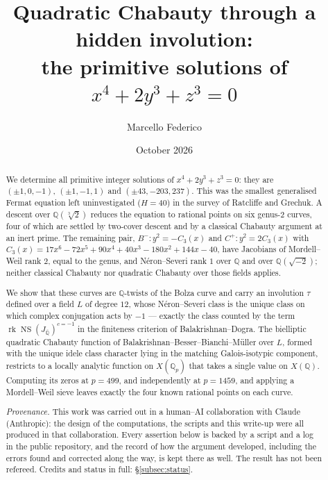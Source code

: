 \documentclass[11pt,reqno]{amsart}
\title[Quadratic Chabauty through a hidden involution]
      {Quadratic Chabauty through a hidden involution:\\
       the primitive solutions of $x^{4}+2y^{3}+z^{3}=0$}
\author{Marcello Federico}
\date{October 2026}
\theoremstyle{plain}
\theoremstyle{definition}
\newcommand{\Q}{\mathbb{Q}}
\newcommand{\Qbar}{\overline{\Q}}
\DeclareMathOperator{\NS}{NS}
\DeclareMathOperator{\rk}{rk}
\numberwithin{equation}{section}
\begin{document}
\begin{abstract}
We determine all primitive integer solutions of $x^{4}+2y^{3}+z^{3}=0$: they are
$(\pm1,0,-1)$, $(\pm1,-1,1)$ and $(\pm43,-203,237)$. This was the smallest
generalised Fermat equation left uninvestigated ($H=40$) in the survey of
Ratcliffe and Grechuk. A descent over $\Q(\sqrt[3]{2})$ reduces the equation to
rational points on six genus-$2$ curves, four of which are settled by two-cover
descent and by a classical Chabauty argument at an inert prime. The remaining
pair, $B^{-}\colon y^{2}=-C_{3}(x)$ and $C^{+}\colon y^{2}=2C_{3}(x)$ with
$C_{3}(x)=17x^{6}-72x^{5}+90x^{4}+40x^{3}-180x^{2}+144x-40$, have Jacobians of
Mordell--Weil rank $2$, equal to the genus, and N\'eron--Severi rank $1$ over
$\Q$ and over $\Q(\sqrt{-2})$; neither classical Chabauty nor quadratic
Chabauty over those fields applies.

We show that these curves are $\Q$-twists of the Bolza curve and carry an
involution $\tau$ defined over a field $L$ of degree $12$, whose N\'eron--Severi
class is the unique class on which complex conjugation acts by $-1$ --- exactly
the class counted by the term $\rk\NS(J_{\Qbar})^{c=-1}$ in the finiteness
criterion of Balakrishnan--Dogra. The bielliptic quadratic Chabauty function of
Balakrishnan--Besser--Bianchi--M\"uller over $L$, formed with the unique idele
class character lying in the matching Galois-isotypic component, restricts to a
locally analytic function on $X(\Q_{p})$ that takes a single value on $X(\Q)$.
Computing its zeros at $p=499$, and independently at $p=1459$, and applying a
Mordell--Weil sieve leaves exactly the four known rational points on each curve.

\medskip
\noindent\emph{Provenance.} This work was carried out in a human--AI
collaboration with Claude (Anthropic): the design of the computations, the
scripts and this write-up were all produced in that collaboration. Every
assertion below is backed by a script and a log in the public repository, and
the record of how the argument developed, including the errors found and
corrected along the way, is kept there as well. The result has not been
refereed. Credits and status in full: \S\ref{subsec:status}.
\end{abstract}

\maketitle

\end{document}
